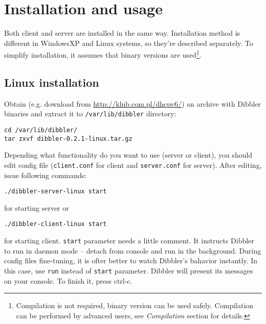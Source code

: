 
\section{Installation and usage}
Both client and server are installed in the same way. Installation
method is different in WindowsXP and Linux systems, so they're described
separately. To simplify installation, it assumes that binary versions
are used\footnote{Compilation is not
  required, binary version can be used safely. Compilation can be performed by
  advanced users, see \emph{Compilation} section for details.}.

\subsection{Linux installation}
Obtain (e.g. download from \url{http://klub.com.pl/dhcpv6/}) an archive with
Dibbler binaries and extract it to \verb+/var/lib/dibbler+ directory:
\begin{verbatim}
cd /var/lib/dibbler/
tar zxvf dibbler-0.2.1-linux.tar.gz 
\end{verbatim}

Depending what functionality do you want to use (server or client),
you should edit config file (\verb+client.conf+ for client and \verb+server.conf+
for server). After editing, issue following commands:

\begin{verbatim}
./dibbler-server-linux start
\end{verbatim}

for starting server or

\begin{verbatim}
./dibbler-client-linux start
\end{verbatim}

for starting client. \verb+start+ parameter needs a little comment. It
instructs Dibbler to run in daemon mode -- detach from console and run
in the background. During config files fine-tuning, it is ofter better
to watch Dibbler's bahavior instantly. In this case, use \verb+run+
instead of \verb+start+ parameter. Dibbler will present its messages on
your console. To finish it, press ctrl-c.

